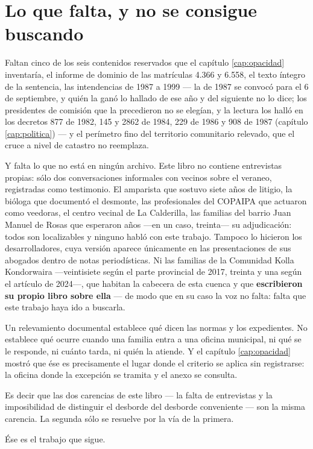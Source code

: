 \section{Lo que falta, y no se consigue buscando}

Faltan cinco de los seis contenidos reservados que el capítulo \ref{cap:opacidad} inventaría, el informe de dominio de las matrículas 4.366 y 6.558, el texto íntegro de la sentencia, las intendencias de 1987 a 1999 --- la de 1987 se convocó para el 6 de septiembre, y quién la ganó lo hallado de ese año y del siguiente no lo dice; los presidentes de comisión que la precedieron no se elegían, y la lectura los halló en los decretos 877 de 1982, 145 y 2862 de 1984, 229 de 1986 y 908 de 1987 (capítulo \ref{cap:politica}) --- y el perímetro fino del territorio comunitario relevado, que el cruce a nivel de catastro no reemplaza.

Y falta lo que no está en ningún archivo. Este libro no contiene entrevistas propias: sólo dos conversaciones informales con vecinos sobre el veraneo, registradas como testimonio. El amparista que sostuvo siete años de litigio, la bióloga que documentó el desmonte, las profesionales del COPAIPA que actuaron como veedoras, el centro vecinal de La Calderilla, las familias del barrio Juan Manuel de Rosas que esperaron años ---en un caso, treinta--- su adjudicación: todos son localizables y ninguno habló con este trabajo. Tampoco lo hicieron los desarrolladores, cuya versión aparece únicamente en las presentaciones de sus abogados dentro de notas periodísticas. Ni las familias de la Comunidad Kolla Kondorwaira ---veintisiete según el parte provincial de 2017, treinta y una según el artículo de 2024---, que habitan la cabecera de esta cuenca y que \textbf{escribieron su propio libro sobre ella} --- de modo que en su caso la voz no falta: falta que este trabajo haya ido a buscarla.

\begin{cautela}
Un relevamiento documental establece qué dicen las normas y los expedientes. No establece qué ocurre cuando una familia entra a una oficina municipal, ni qué se le responde, ni cuánto tarda, ni quién la atiende. Y el capítulo \ref{cap:opacidad} mostró que ése es precisamente el lugar donde el criterio se aplica sin registrarse: la oficina donde la excepción se tramita y el anexo se consulta.

Es decir que las dos carencias de este libro --- la falta de entrevistas y la imposibilidad de distinguir el desborde del desborde conveniente --- son la misma carencia. La segunda sólo se resuelve por la vía de la primera.

Ése es el trabajo que sigue.
\end{cautela}
